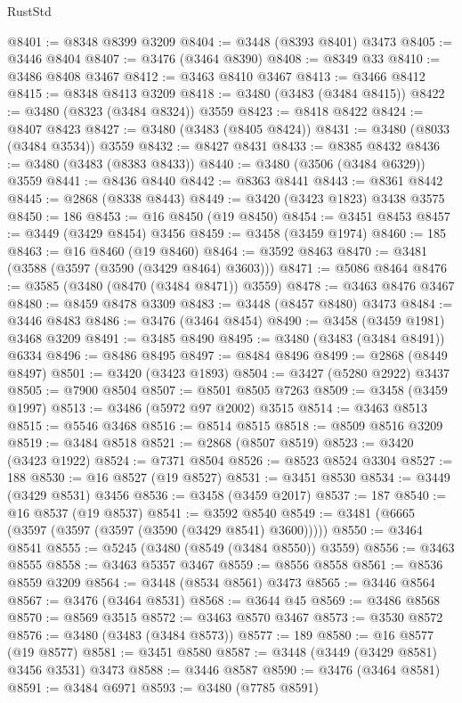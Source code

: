 \begin{lexlean}{RustStd}
\begin{coremodule}
{{{{{{{{{{{{{{{{{{{@8401 := @8348 @8399 @3209
@8404 := @3448 (@8393 @8401) @3473
@8405 := @3446 @8404
@8407 := @3476 (@3464 @8390)
@8408 := @8349 @33
@8410 := @3486 @8408 @3467
@8412 := @3463 @8410 @3467
@8413 := @3466 @8412
@8415 := @8348 @8413 @3209
@8418 := @3480 (@3483 (@3484 @8415))
@8422 := @3480 (@8323 (@3484 @8324)) @3559
@8423 := @8418 @8422
@8424 := @8407 @8423
@8427 := @3480 (@3483 (@8405 @8424))
@8431 := @3480 (@8033 (@3484 @3534)) @3559
@8432 := @8427 @8431
@8433 := @8385 @8432
@8436 := @3480 (@3483 (@8383 @8433))
@8440 := @3480 (@3506 (@3484 @6329)) @3559
@8441 := @8436 @8440
@8442 := @8363 @8441
@8443 := @8361 @8442
@8445 := @2868 (@8338 @8443)
@8449 := @3420 (@3423 @1823) @3438 @3575
@8450 := 186
@8453 := @16 @8450 (@19 @8450)
@8454 := @3451 @8453
@8457 := @3449 (@3429 @8454) @3456
@8459 := @3458 (@3459 @1974)
@8460 := 185
@8463 := @16 @8460 (@19 @8460)
@8464 := @3592 @8463
@8470 := @3481 (@3588 (@3597 (@3590 (@3429 @8464) @3603)))
@8471 := @5086 @8464
@8476 := @3585 (@3480 (@8470 (@3484 @8471)) @3559)
@8478 := @3463 @8476 @3467
@8480 := @8459 @8478 @3309
@8483 := @3448 (@8457 @8480) @3473
@8484 := @3446 @8483
@8486 := @3476 (@3464 @8454)
@8490 := @3458 (@3459 @1981) @3468 @3209
@8491 := @3485 @8490
@8495 := @3480 (@3483 (@3484 @8491)) @6334
@8496 := @8486 @8495
@8497 := @8484 @8496
@8499 := @2868 (@8449 @8497)
@8501 := @3420 (@3423 @1893)
@8504 := @3427 (@5280 @2922) @3437
@8505 := @7900 @8504
@8507 := @8501 @8505 @7263
@8509 := @3458 (@3459 @1997)
@8513 := @3486 (@5972 @97 @2002) @3515
@8514 := @3463 @8513
@8515 := @5546 @3468
@8516 := @8514 @8515
@8518 := @8509 @8516 @3209
@8519 := @3484 @8518
@8521 := @2868 (@8507 @8519)
@8523 := @3420 (@3423 @1922)
@8524 := @7371 @8504
@8526 := @8523 @8524 @3304
@8527 := 188
@8530 := @16 @8527 (@19 @8527)
@8531 := @3451 @8530
@8534 := @3449 (@3429 @8531) @3456
@8536 := @3458 (@3459 @2017)
@8537 := 187
@8540 := @16 @8537 (@19 @8537)
@8541 := @3592 @8540
@8549 := @3481 (@6665 (@3597 (@3597 (@3597 (@3590 (@3429 @8541) @3600)))))
@8550 := @3464 @8541
@8555 := @5245 (@3480 (@8549 (@3484 @8550)) @3559)
@8556 := @3463 @8555
@8558 := @3463 @5357 @3467
@8559 := @8556 @8558
@8561 := @8536 @8559 @3209
@8564 := @3448 (@8534 @8561) @3473
@8565 := @3446 @8564
@8567 := @3476 (@3464 @8531)
@8568 := @3644 @45
@8569 := @3486 @8568
@8570 := @8569 @3515
@8572 := @3463 @8570 @3467
@8573 := @3530 @8572
@8576 := @3480 (@3483 (@3484 @8573))
@8577 := 189
@8580 := @16 @8577 (@19 @8577)
@8581 := @3451 @8580
@8587 := @3448 (@3449 (@3429 @8581) @3456 @3531) @3473
@8588 := @3446 @8587
@8590 := @3476 (@3464 @8581)
@8591 := @3484 @6971
@8593 := @3480 (@7785 @8591)
}}}}}}}}}}}}}}}}}}}
\end{coremodule}
\end{lexlean}
